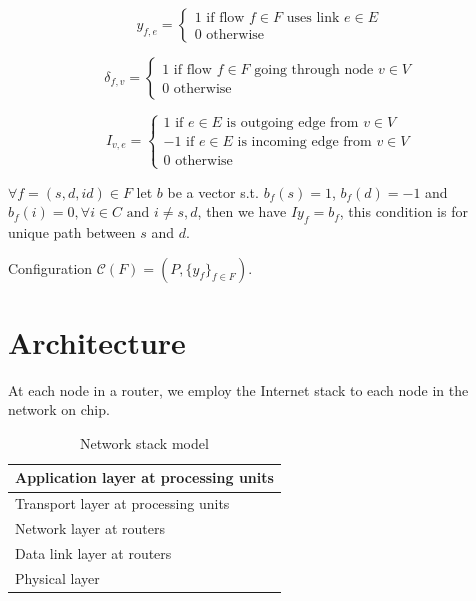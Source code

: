 \documentclass[a4]{article}
\begin{document}
\begin{equation}
y_{f,e} = \left\{ \begin{array}{lrc}
1 \mbox{ if flow } f \in F \mbox{ uses link } e \in E \\
0 \mbox{ otherwise} 
\end{array}\right.
\end{equation}

\begin{equation}
\delta_{f,v} = \left\{ \begin{array}{lrc}
1 \mbox{ if flow } f \in F \mbox{ going through node } v \in V \\
0 \mbox{ otherwise} 
\end{array}\right.
\end{equation}

\begin{equation}
I_{v,e} = \left\{ \begin{array}{lrc}
1 \mbox{ if } e \in E \mbox{ is outgoing edge from } v \in V \\
-1 \mbox{ if } e \in E \mbox{ is incoming edge from } v \in V \\
0 \mbox{ otherwise}
\end{array}\right. 
\end{equation}

$\forall f=(s, d, id) \in F$  let $b$ be a vector s.t. $b_f(s) = 1$, 
$b_f(d) = -1$ and $b_f(i) = 0, \forall i \in C \mbox{ and } i \neq s, d$,
 then we have $Iy_f=b_f$, this condition is for unique path between $s$ and $d$.

Configuration $\mathcal{C}(F)=(P, \{y_f\}_{f \in F})$.
\section{Architecture}
At each node in a router, we employ the Internet stack to each node in the 
network on chip.
\begin{table}[h]
\begin{center}
  \begin{tabular}{ | l | }
    \hline
    Application layer at processing units \\ \hline
    Transport layer at processing units \\ \hline
    Network layer at routers \\ \hline
	Data link layer at routers \\ \hline
	Physical layer \\
    \hline
  \end{tabular}
\end{center}
\caption{Network stack model}
\label{table:NetworkStack}
\end{table}
\end{document}
